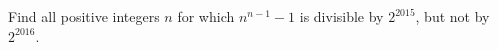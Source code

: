 Find all positive integers $n$ for which $n^{n-1} - 1$ is divisible by $2^{2015}$,  but not by $2^{2016}$.